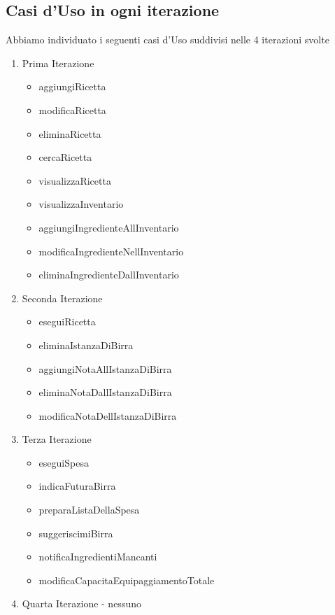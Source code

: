\documentclass[a4paper,12pt]{report}
\begin{document}
		\subsection{Casi d'Uso in ogni iterazione}
			Abbiamo individuato i seguenti casi d'Uso suddivisi nelle 4 iterazioni svolte
			\begin{enumerate}
    				\item Prima Iterazione
					\begin{itemize}
						\item aggiungiRicetta	
						\item modificaRicetta	
						\item eliminaRicetta	
						\item cercaRicetta	
						\item visualizzaRicetta	
						\item visualizzaInventario	
						\item aggiungiIngredienteAllInventario	
						\item modificaIngredienteNellInventario	
						\item eliminaIngredienteDallInventario
					\end{itemize}
    				\item Seconda Iterazione
					\begin{itemize}
						\item eseguiRicetta	
						\item eliminaIstanzaDiBirra	
						\item aggiungiNotaAllIstanzaDiBirra		
						\item eliminaNotaDallIstanzaDiBirra	
						\item modificaNotaDellIstanzaDiBirra		
					\end{itemize}			
    				\item Terza Iterazione
					\begin{itemize}
						\item eseguiSpesa	
						\item indicaFuturaBirra	
						\item preparaListaDellaSpesa	
						\item suggeriscimiBirra	
						\item notificaIngredientiMancanti	
						\item modificaCapacitaEquipaggiamentoTotale		
					\end{itemize}
				\item Quarta Iterazione - nessuno
			\end{enumerate}
		
\end{document}
